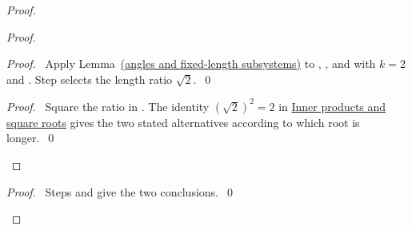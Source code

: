 \begin{mergedproofsection}
\begin{proof}
\begin{proof}
 \begin{proof}\pf\ Apply Lemma~\hyperref[lem:angles]{(angles and fixed-length subsystems)}
 to , , and  with $k=2$
 and . Step  selects the
 length ratio $\sqrt2$.~\qed\end{proof}
 \qedstep
 \begin{proof}\pf\ Square the ratio in .
 The identity $(\sqrt2)^2=2$ in
 \hyperref[facts:312-inner]{Inner products and square roots} gives
 the two stated alternatives according to which root is longer.~\qed\end{proof}
\end{proof}
\qedstep
\begin{proof}\pf\ Steps  and
 give the two conclusions.~\qed\end{proof}
\end{proof}


\end{mergedproofsection}
